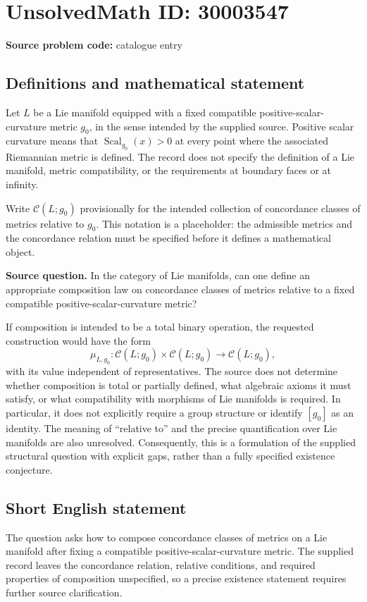 \documentclass[11pt]{article}
\begin{document}
\section*{UnsolvedMath ID: 30003547}
\textbf{Source problem code:} catalogue entry
\subsection{Definitions and mathematical statement}
Let \(L\) be a Lie manifold equipped with a fixed compatible positive-scalar-curvature metric \(g_0\), in the sense intended by the supplied source. Positive scalar curvature means that \(\operatorname{Scal}_{g_0}(x)>0\) at every point where the associated Riemannian metric is defined. The record does not specify the definition of a Lie manifold, metric compatibility, or the requirements at boundary faces or at infinity.

Write \(\mathcal C(L;g_0)\) provisionally for the intended collection of concordance classes of metrics relative to \(g_0\). This notation is a placeholder: the admissible metrics and the concordance relation must be specified before it defines a mathematical object.

\textbf{Source question.} In the category of Lie manifolds, can one define an appropriate composition law on concordance classes of metrics relative to a fixed compatible positive-scalar-curvature metric?

If composition is intended to be a total binary operation, the requested construction would have the form
\[
\mu_{L,g_0}\colon \mathcal C(L;g_0)\times\mathcal C(L;g_0)\longrightarrow\mathcal C(L;g_0),
\]
with its value independent of representatives. The source does not determine whether composition is total or partially defined, what algebraic axioms it must satisfy, or what compatibility with morphisms of Lie manifolds is required. In particular, it does not explicitly require a group structure or identify \([g_0]\) as an identity. The meaning of ``relative to'' and the precise quantification over Lie manifolds are also unresolved. Consequently, this is a formulation of the supplied structural question with explicit gaps, rather than a fully specified existence conjecture.
\subsection{Short English statement}
The question asks how to compose concordance classes of metrics on a Lie manifold after fixing a compatible positive-scalar-curvature metric. The supplied record leaves the concordance relation, relative conditions, and required properties of composition unspecified, so a precise existence statement requires further source clarification.
\end{document}

